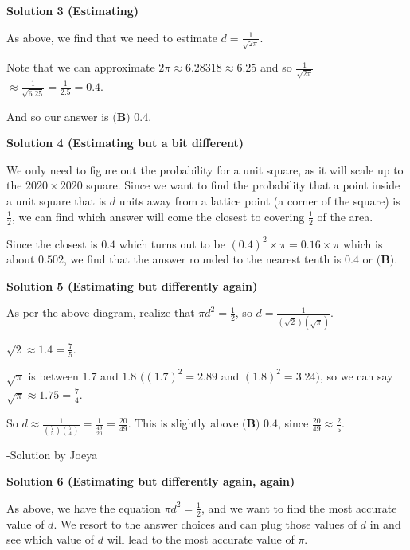\begin{enumerate}
\textbf{Solution 3 (Estimating)}

As above, we find that we need to estimate $d = \frac{1}{\sqrt{2\pi}}$. 

 Note that we can approximate $2\pi \approx 6.28318 \approx 6.25$ and so $\frac{1}{\sqrt{2\pi}}$ $\approx \frac{1}{\sqrt{6.25}}=\frac{1}{2.5}=0.4$.

 And so our answer is $\boxed{\textbf{(B) } 0.4}$.

 



\textbf{Solution 4 (Estimating but a bit different)}

We only need to figure out the probability for a unit square, as it will scale up to the $2020\times 2020$ square. Since we want to find the probability that a point inside a unit square that is $d$ units away from a lattice point (a corner of the square) is $\frac{1}{2}$, we can find which answer will come the closest to covering $\frac{1}{2}$ of the area. 

 Since the closest is $0.4$ which turns out to be $(0.4)^2\times \pi = 0.16 \times \pi$ which is about $0.502$, we find that the answer rounded to the nearest tenth is $0.4$ or $\boxed{\textbf{(B)}}$.

 



\textbf{Solution 5 (Estimating but differently again)}

As per the above diagram, realize that $\pi d^2 = \frac{1}{2}$, so $d = \frac{1}{(\sqrt{2})(\sqrt{\pi})}$.

 $\sqrt{2} \approx 1.4 = \frac{7}{5}$.

 $\sqrt{\pi}$ is between $1.7$ and $1.8$ $((1.7)^2 = 2.89$ and $(1.8)^2 = 3.24)$, so we can say $\sqrt{\pi} \approx 1.75 = \frac{7}{4}$.

 So $d \approx \frac{1}{(\frac{7}{5})(\frac{7}{4})} = \frac{1}{\frac{49}{20}} = \frac{20}{49}$. This is slightly above $\boxed{\textbf{(B) } 0.4}$, since $\frac{20}{49} \approx \frac{2}{5}$.

 -Solution by Joeya

 



\textbf{Solution 6 (Estimating but differently again, again)}

As above, we have the equation $\pi d^2 = \frac{1}{2}$, and we want to find the most accurate value of $d$. We resort to the answer choices and can plug those values of $d$ in and see which value of $d$ will lead to the most accurate value of $\pi$.


\end{enumerate}
